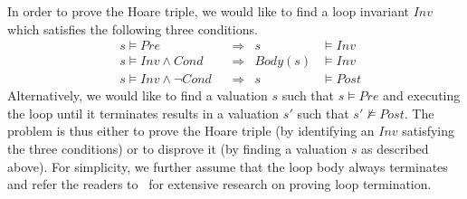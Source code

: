 In order to prove the Hoare triple, we would like to find a loop invariant $\mathit{Inv}$ which satisfies the following three conditions.
\begin{align}
    &s \models \mathit{Pre}
        &&\Longrightarrow & s &\models \mathit{Inv} \label{inv:pre} \\
    &s \models \mathit{Inv} \wedge \mathit{Cond}
        &&\Longrightarrow & \mathit{Body}(s) &\models \mathit{Inv} \label{inv:loop} \\
    &s \models \mathit{Inv} \wedge \neg \mathit{Cond}
        &&\Longrightarrow & s &\models \mathit{Post} \label{inv:post}
\end{align}
Alternatively, we would like to find a valuation $s$ such that $s \models \mathit{Pre}$ and executing the loop until it terminates results in a valuation $s'$ such that $s' \not \models Post$.
The problem is thus either to prove the Hoare triple (by identifying an $\mathit{Inv}$ satisfying the three conditions) or to disprove it (by finding a valuation $s$ as described above). For simplicity, we further assume that the loop body always terminates and refer the readers to~ \cite{Domagoj:FAC:2013,LeQC:PLDI:15,Hong:ASE:2015} %
for extensive research on proving loop termination.

